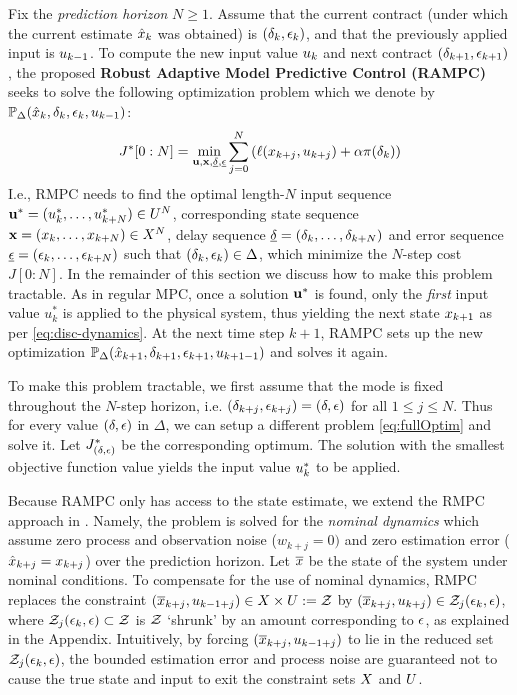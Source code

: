 Fix the \emph{prediction horizon} $N \geq 1$.
Assume that the current contract (under which the current estimate $\hat{x}_k$ was obtained) is $(\delta_{k},\epsilon_{k})$, and that the previously applied input is $u_{k-1}$.
To compute the new input value $u_{k}$ and next contract $(\delta_{k+1},\epsilon_{k+1})$, the proposed \textbf{Robust Adaptive Model Predictive Control (RAMPC)} seeks to solve the following optimization problem which we denote by $\mathbb{P}_{\Delta}(\hat{x}_{k},\delta_{k},\epsilon_{k},u_{k -1})$:
\begin{eqnarray}
\label{eq:fullOptim}
J^*[0:N]= \min_{\mathbf{u},\mathbf{x},\underline{\delta},\underline{\epsilon}}\sum_{j=0}^{N}\left(\ell(x_{k+j},u_{k+j})+\alpha\pi(\delta_k)\right)
\end{eqnarray}
I.e., RMPC needs to find the optimal length-$N$ input sequence  $\mathbf{u}^* = (u_k^*,\ldots,u_{k+N}^*) \in U^N$, corresponding state sequence $\mathbf{x} = (x_k,\ldots,x_{k+N}) \in X^N$, delay sequence $\underline{\delta} = (\delta_k,\ldots,\delta_{k+N})$ and error sequence $\underline{\epsilon} = (\epsilon_k,\ldots,\epsilon_{k+N})$ such that $(\delta_{k},\epsilon_{k}) \in \Delta$, which minimize the $N$-step cost $J[0:N]$.
In the remainder of this section we discuss how to make this problem tractable.
As in regular MPC, once a solution $\mathbf{u}^*$ is found, only the \emph{first} input value $u_k^*$ is applied to the physical system, thus yielding the next state $x_{k+1}$ as per \eqref{eq:disc-dynamics}.
At the next time step $k+1$, RAMPC sets up the new optimization $\mathbb{P}_{\Delta}(\hat{x}_{k+1},\delta_{k+1},\epsilon_{k+1},u_{k+1 -1})$ and solves it again.

To make this problem tractable, we first assume that the mode is fixed throughout the $N$-step horizon, i.e. $(\delta_{k+j},\epsilon_{k+j}) = (\delta,\epsilon)$ for all $1 \leq j \leq N$.
Thus for every value $(\delta,\epsilon)$ in $\Delta$, we can setup a different problem \eqref{eq:fullOptim} and solve it.
Let $J_{(\delta,\epsilon)}^*$ be the corresponding optimum.
The solution with the smallest objective function value yields the input value $u^*_k$ to be applied.

Because RAMPC only has access to the state estimate, we extend the RMPC approach in \cite{richardsetal05rmp, chiscietal01swp}.
Namely, the problem is solved for the \emph{nominal dynamics} which assume zero process and observation noise ($w_{k+j} = 0)$ and zero estimation error ($\hat{x}_{k+j}=x_{k+j}$) over the prediction horizon.
Let $\overline{x}$ be the state of the system under nominal conditions.
To compensate for the use of nominal dynamics, RMPC replaces the constraint $(\overline{x}_{k+j},u_{k-1+j}) \in X \times U := \mathcal{Z}$ 
by $(\overline{x}_{k+j},u_{k+j}) \in \mathcal{Z}_{j}(\epsilon_k,\epsilon)$,
where $\mathcal{Z}_{j}(\epsilon_k,\epsilon) \subset \mathcal{Z}$ is $\mathcal{Z}$ `shrunk' by an amount corresponding to $\epsilon$, as explained in the Appendix.
Intuitively, by forcing $(\overline{x}_{k+j},u_{k-1+j})$ to lie in the reduced set $\mathcal{Z}_{j}(\epsilon_k,\epsilon)$, the bounded estimation error and process noise are guaranteed not to cause the true state and input to exit the constraint sets $X$ and $U$.


